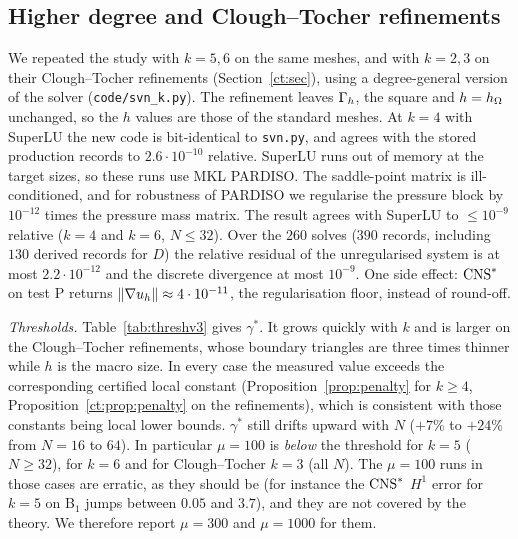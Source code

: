 \subsection{Higher degree and Clough--Tocher refinements}\label{sec:numv3}
We repeated the study with $k=5,6$ on the same meshes, and with $k=2,3$ on their Clough--Tocher refinements (Section~\ref{ct:sec}), using a degree-general version of the solver (\texttt{code/svn\_k.py}). The refinement leaves $\Gamma_h$, the square and $h=h_\Omega$ unchanged, so the $h$ values are those of the standard meshes. At $k=4$ with SuperLU the new code is bit-identical to \texttt{svn.py}, and agrees with the stored production records to $2.6\cdot10^{-10}$ relative. SuperLU runs out of memory at the target sizes, so these runs use MKL PARDISO. The saddle-point matrix is ill-conditioned, and for robustness of PARDISO we regularise the pressure block by $10^{-12}$ times the pressure mass matrix. The result agrees with SuperLU to $\le10^{-9}$ relative ($k=4$ and $k=6$, $N\le32$). Over the $260$ solves ($390$ records, including $130$ derived records for $D$) the relative residual of the unregularised system is at most $2.2\cdot10^{-12}$ and the discrete divergence at most $10^{-9}$. One side effect: $\mathrm{CNS}^\ast$ on test P returns $\lVert \nabla u_h\rVert\approx4\cdot10^{-11}$, the regularisation floor, instead of round-off.

\emph{Thresholds.} Table~\ref{tab:threshv3} gives $\gamma^\ast$. It grows quickly with $k$ and is larger on the Clough--Tocher refinements, whose boundary triangles are three times thinner while $h$ is the macro size. In every case the measured value exceeds the corresponding certified local constant (Proposition~\ref{prop:penalty} for $k\ge4$, Proposition~\ref{ct:prop:penalty} on the refinements), which is consistent with those constants being local lower bounds. $\gamma^\ast$ still drifts upward with $N$ ($+7\%$ to $+24\%$ from $N=16$ to $64$). In particular $\mu=100$ is \emph{below} the threshold for $k=5$ ($N\ge32$), for $k=6$ and for Clough--Tocher $k=3$ (all $N$). The $\mu=100$ runs in those cases are erratic, as they should be (for instance the $\mathrm{CNS}^\ast$ $H^1$ error for $k=5$ on B$_1$ jumps between $0.05$ and $3.7$), and they are not covered by the theory. We therefore report $\mu=300$ and $\mu=1000$ for them.

